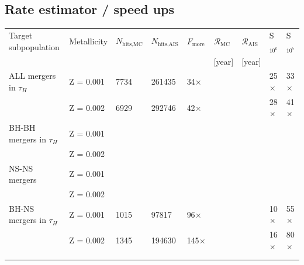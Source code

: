 \documentclass[a4paper,fleqn,usenatbib]{mnras}
\newcommand\rate{\mathcal{R}}
\newcommand{\SpeedUpALLone}{25$\times$}
\newcommand{\SpeedUpALLoneTenmillion}{33$\times$}
\newcommand\HitsALLMCone{7734}
\newcommand\HitsALLAISone{261435}
\newcommand{\fractionMoreHitsALLone}{34$\times$}
\newcommand{\SpeedUpALLtwo}{28$\times$}
\newcommand{\SpeedUpALLtwoTenmillion}{41$\times$}
\newcommand\HitsALLMCtwo{6929}
\newcommand\HitsALLAIStwo{292746}
\newcommand{\fractionMoreHitsALLtwo}{42$\times$}
\newcommand{\SpeedUpBHNSone}{10$\times$}
\newcommand{\SpeedUpBHNSoneTenmillion}{55$\times$}
\newcommand\HitsBHNSMCone{1015}
\newcommand\HitsBHNSAISone{97817}
\newcommand{\fractionMoreHitsBHNSone}{96$\times$}
\newcommand{\SpeedUpBHNStwo}{16$\times$}
\newcommand{\SpeedUpBHNStwoTenmillion}{80$\times$}
\newcommand\HitsBHNSMCtwo{1345}
\newcommand\HitsBHNSAIStwo{194630}
\newcommand{\fractionMoreHitsBHNStwo}{145$\times$}
\begin{document}
\subsection{ Rate estimator / speed ups}
\label{subsec:RateI}
\begin{table} %
\centering
\label{my-label}
\begin{tabular}{|l|l|l|l|l|l|l|l|l|}
\hline
Target subpopulation        & Metallicity & $N_{\text{hits,MC}}$ & $ N_{\text{hits,AIS}}$ & $F_{\text{more hits}}$ 		 &  $\rate_{\text{MC}}$  & $\rate_{\text{AIS}}$   & S$_{10^6}$         & S$_{10^7}$  					\\
						    &			  &	 		 			 & 	 					  &	           		  		& [year]      & [year]       & 	&  	\\ \hline
ALL mergers in $\tau_{H}$   & Z = 0.001    & \HitsALLMCone 		 & \HitsALLAISone 		  & \fractionMoreHitsALLone &  		   &  			  & \SpeedUpALLone  & \SpeedUpALLoneTenmillion \\
						    & Z = 0.002   & \HitsALLMCtwo 		 & \HitsALLAIStwo 		  & \fractionMoreHitsALLtwo &  		   &  			  & \SpeedUpALLtwo  & \SpeedUpALLtwoTenmillion \\
BH-BH mergers in $\tau_{H}$ & Z = 0.001   &  & & & &  &  &  \\ %
						    & Z = 0.002   &  & & & &  &  &  \\ %
NS-NS mergers 				& Z = 0.001   &  & & & &  &  &  \\ %
						    & Z = 0.002   &  & & & &  &  &  \\ %
BH-NS mergers in $\tau_{H}$ & Z = 0.001   & \HitsBHNSMCone 		 & \HitsBHNSAISone 		  & \fractionMoreHitsBHNSone &  		   &  			  & \SpeedUpBHNSone  & \SpeedUpBHNSoneTenmillion \\ 
						    & Z = 0.002   & \HitsBHNSMCtwo 		 & \HitsBHNSAIStwo 		  & \fractionMoreHitsBHNStwo &  		   &  			  & \SpeedUpBHNStwo  & \SpeedUpBHNStwoTenmillion \\ %
						    &  &  &  &  & & & &  \\ %
						    &  &  &  &  & & & &  \\ \hline

\end{tabular}
\end{table}
\end{document}
